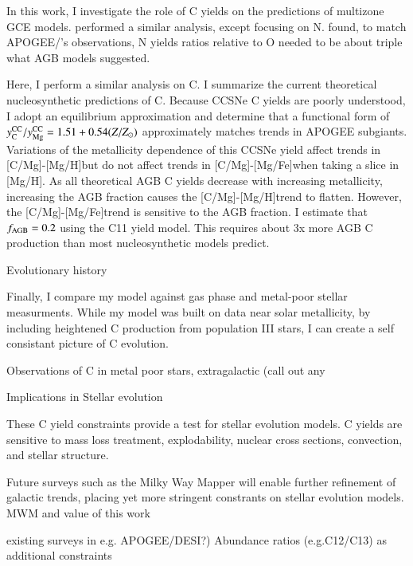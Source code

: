 \documentclass[12pt,oneside]{report}
\newcommand{\caah}{[C/Mg]-[Mg/H]}
\newcommand{\caafe}{[C/Mg]-[Mg/Fe]}
\newcommand{\Ycc}{\ensuremath{y_{\rm C}^{\rm CC}}}
\newcommand{\Yoc}{\ensuremath{y_{\rm Mg}^{\rm CC}}}
\begin{document}
In this work, I investigate the role of C yields on the predictions of multizone GCE models. \citet{james+22} performed a similar analysis, except focusing on N. \citet{james+22} found, to match APOGEE/\citet{fiorenzo+21}'s observations, N yields ratios relative to O needed to be about triple what AGB models suggested.

Here, I perform a similar analysis on C. I summarize the current theoretical nucleosynthetic predictions of C. Because CCSNe C yields are poorly understood, I adopt an equilibrium approximation and determine that a functional form of $\Ycc/\Yoc=1.51 + 0.54 (Z/Z_\odot)$ approximately matches trends in APOGEE subgiants. Variations of the metallicity dependence of this CCSNe yield affect trends in \caah but do not affect trends in \caafe when taking a slice in [Mg/H]. As all theoretical AGB C yields decrease with increasing metallicity, increasing the AGB fraction causes the \caah trend to flatten. However, the \caafe trend is sensitive to the AGB fraction. 
I estimate that $f_{\rm AGB} = 0.2$ using the C11 yield model. This requires about 3x more AGB C production than most nucleosynthetic models predict.

Evolutionary history

Finally, I compare my model against gas phase and metal-poor stellar measurments. While my model was built on data near solar metallicity, by including heightened C production from population III stars, I can create a self consistant picture of C evolution.

Observations of C in metal poor stars, extragalactic (call out any

Implications in Stellar evolution

These C yield constraints provide a test for stellar evolution models. C yields are sensitive to mass loss treatment, explodability, nuclear cross sections, convection, and stellar structure. 

Future surveys such as the Milky Way Mapper will enable further refinement of galactic trends, placing yet more stringent constrants on stellar evolution models.
MWM and value of this work

existing surveys in e.g. APOGEE/DESI?)
Abundance ratios (e.g.C12/C13) as additional constraints





\newpage

\end{document}
